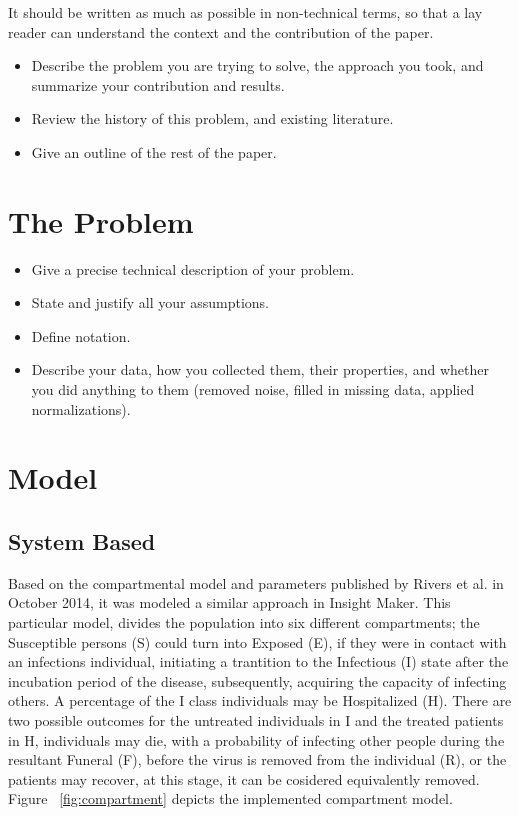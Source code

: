 \documentclass[10pt]{article}
\begin{document}
It should be written as much as possible in non-technical terms, so that a
lay reader can understand the context and the contribution of the paper.

\begin{itemize}
\item Describe the problem you are trying to solve, the approach
you took, and summarize your contribution and results.

\item Review the history of this problem, and existing literature.

\item Give an outline of the rest of the paper.
\end{itemize}

\section{The Problem}
\begin{itemize}
\item Give a precise technical description of your problem. 

\item State and justify all your assumptions. 

\item Define notation. 

\item Describe your data, how you collected them, their properties,
and whether you did 
anything to them (removed noise, filled in missing data, 
applied normalizations).
\end{itemize}
%
%
%
%
%
%
%
%
%

\section{Model}\label{sec:Model}
%
%
\subsection{System Based}
Based on the compartmental model and parameters published by Rivers et al.\cite{Rivers2014} in October 2014, it was modeled a similar approach in Insight Maker.  This particular model, divides the population into six different compartments; the Susceptible persons (S) could turn into Exposed (E), if they were in contact with an infections individual, initiating a trantition to the Infectious (I) state after the incubation period of the disease, subsequently, acquiring the capacity of infecting others. A percentage of the I class individuals may be Hospitalized (H). There are two possible outcomes for the untreated individuals in I and the treated patients in H, individuals may die, with a probability of infecting other people during the resultant Funeral (F), before the virus is removed from the individual (R), or the patients may recover, at this stage, it can be cosidered equivalently removed. Figure ~\ref{fig:compartment} depicts the implemented compartment model. \\
\end{document}

